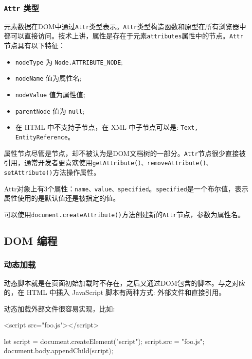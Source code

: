 \subsubsection*{\texttt{Attr} 类型}

元素数据在DOM中通过\texttt{Attr}类型表示。\texttt{Attr}类型构造函数和原型在所有浏览器中都可以直接访问。技术上讲，属性是存在于元素\texttt{attributes}属性中的节点。\texttt{Attr}节点具有以下特征：

\begin{itemize}
    \item \texttt{nodeType} 为 \texttt{Node.ATTRIBUTE\_NODE};
    \item \texttt{nodeName} 值为属性名;
    \item \texttt{nodeValue} 值为属性值;
    \item \texttt{parentNode} 值为 \texttt{null};
    \item 在 HTML 中不支持子节点，在 XML 中子节点可以是: \texttt{Text, EntityReference}。
\end{itemize}

属性节点尽管是节点，却不被认为是DOM文档树的一部分。\texttt{Attr}节点很少直接被引用，通常开发者更喜欢使用\texttt{getAttribute()、removeAttribute()、setAttribute()}方法操作属性。

Attr对象上有3个属性：\texttt{name、value、specified}。\texttt{specified}是一个布尔值，表示属性使用的是默认值还是被指定的值。

可以使用\texttt{document.createAttribute()}方法创建新的\texttt{Attr}节点，参数为属性名。

\subsection{DOM 编程}

\subsubsection*{动态加载}

动态脚本就是在页面初始加载时不存在，之后又通过DOM包含的脚本。与之对应的，在 HTML 中插入 JavaScript 脚本有两种方式: 外部文件和直接引用。

动态加载外部文件很容易实现，比如:
\begin{HTML}
<script src="foo.js"></script> 
\end{HTML}

\begin{JavaScript}
let script = document.createElement("script"); 
script.src = "foo.js"; 
document.body.appendChild(script); 
\end{JavaScript}


